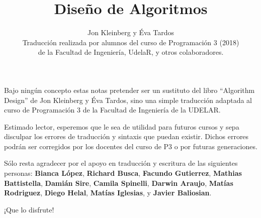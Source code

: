 \documentclass[a4paper, 12pt]{book}
\title{Diseño de Algoritmos}
\author{Jon Kleinberg y Éva Tardos\\ Traducción realizada por alumnos del curso de Programación 3 (2018)\\ de la Facultad de Ingeniería, UdelaR, y otros colaboradores.}
\begin{document}
\maketitle	







\chapter*{}

Bajo ningún concepto estas notas pretender ser un sustituto del libro ``Algorithm Design'' de Jon Kleinberg y Éva Tardos, sino una simple traducción adaptada al curso de Programación 3 de la Facultad de Ingeniería de la UDELAR. 

Estimado lector, esperemos que le sea de utilidad para futuros cursos y sepa disculpar los errores de traducción y sintaxis que puedan existir. Dichos errores podrán ser corregidos por los docentes del curso de P3 o por futuras generaciones.

Sólo resta agradecer por el apoyo en traducción y escritura de las siguientes personas: \textbf{Bianca López}, \textbf{Richard Busca}, \textbf{Facundo Gutierrez}, \textbf{Mathias Battistella}, \textbf{Damián Sire}, \textbf{Camila Spinelli}, \textbf{Darwin Araujo},  \textbf{Matías Rodriguez}, \textbf{Diego Helal}, \textbf{Matías Iglesias}, y \textbf{Javier Baliosian}.


\begin{center}
\huge{¡Que lo disfrute!}
\end{center}


\tableofcontents

\end{document}
